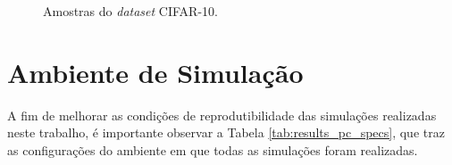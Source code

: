 \begin{figure}[H]
    \hspace{0.1cm}
    \hspace{0.1cm}
    \hspace{0.1cm}
    \hspace{0.1cm}
    \caption{Amostras do \textit{dataset} CIFAR-10.}
    \label{fig:datasets_cifar}
\end{figure}


\section{Ambiente de Simulação}
\label{sec:results_simulation_environment}

A fim de melhorar as condições de reprodutibilidade das simulações realizadas neste trabalho, é importante observar a Tabela \ref{tab:results_pc_specs}, que traz as configurações do ambiente em que todas as simulações foram realizadas.



